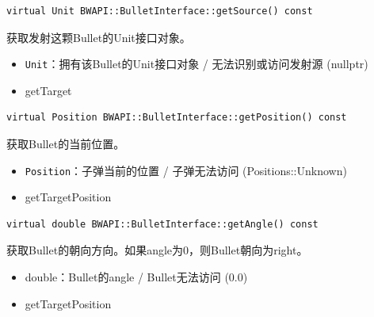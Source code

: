 \begin{tcolorbox}[colback=white, colframe=black!60!white, title=getSource(), arc=0mm]
    \begin{verbatim}
virtual Unit BWAPI::BulletInterface::getSource() const
    \end{verbatim}
    获取发射这颗Bullet的Unit接口对象。
    \begin{return}
        \begin{itemize}
            \item \texttt{Unit}：拥有该Bullet的Unit接口对象 / 无法识别或访问发射源 (nullptr)
        \end{itemize}
    \end{return}
    \begin{refer}
        \begin{itemize}
            \item getTarget
        \end{itemize}
    \end{refer}
\end{tcolorbox}

\begin{tcolorbox}[colback=white, colframe=black!60!white, title=getPosition(), arc=0mm]
    \begin{verbatim}
virtual Position BWAPI::BulletInterface::getPosition() const
    \end{verbatim}
    获取Bullet的当前位置。
    \begin{return}
        \begin{itemize}
            \item \texttt{Position}：子弹当前的位置 / 子弹无法访问 (Positions::Unknown)
        \end{itemize}
    \end{return}
    \begin{refer}
        \begin{itemize}
            \item getTargetPosition
        \end{itemize}
    \end{refer}
\end{tcolorbox}

\begin{tcolorbox}[colback=white, colframe=black!60!white, title=getAngle(), arc=0mm]
    \begin{verbatim}
virtual double BWAPI::BulletInterface::getAngle() const
    \end{verbatim}
    获取Bullet的朝向方向。如果angle为0，则Bullet朝向为right。
    \begin{return}
        \begin{itemize}
            \item double：Bullet的angle / Bullet无法访问 (0.0)
        \end{itemize}
    \end{return}
    \begin{refer}
        \begin{itemize}
            \item getTargetPosition
        \end{itemize}
    \end{refer}
\end{tcolorbox}


